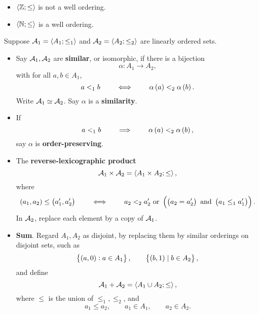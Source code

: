 \begin{example*}
\hfill
\begin{itemize}
\item $ \abr{\Z; \le} $ is not a well ordering.
\item $ \abr{\N; \le} $ is a well ordering.
\end{itemize}
\end{example*}


Suppose $ \AA_1 = \abr{A_1; \le_1} $ and $ \AA_2 = \abr{A_2; \le_2} $ are linearly ordered sets.

\begin{definition}
\hfill
\begin{itemize}
\item Say $ \AA_1, \AA_2 $ are \textbf{similar}, or isomorphic, if there is a bijection
$$ \alpha : A_1 \to A_2, $$
with for all $ a, b \in A_1 $,
$$ a <_1 b \qquad \iff \qquad \alpha\br{a} <_2 \alpha\br{b}. $$
Write $ \AA_1 \simeq \AA_2 $. Say $ \alpha $ is a \textbf{similarity}.
\item If
$$ a <_1 b \qquad \implies \qquad \alpha\br{a} <_2 \alpha\br{b}, $$
say $ \alpha $ is \textbf{order-preserving}.
\end{itemize}
\end{definition}

\begin{definition}
\hfill
\begin{itemize}
\item The \textbf{reverse-lexicographic product}
$$ \AA_1 \times \AA_2 = \abr{A_1 \times A_2; \le}, $$
where
$$ \br{a_1, a_2} \le \br{a_1', a_2'} \qquad \iff \qquad a_2 <_2 a_2' \ \text{or} \ \br{\br{a_2 = a_2'} \ \text{and} \ \br{a_1 \le_1 a_1'}}. $$
In $ \AA_2 $, replace each element by a copy of $ \AA_1 $.
\item \textbf{Sum}. Regard $ A_1, A_2 $ as disjoint, by replacing them by similar orderings on disjoint sets, such as
$$ \cbr{\br{a, 0} : a \in A_1}, \qquad \cbr{\br{b, 1} \mid b \in A_2}, $$
and define
$$ \AA_1 + \AA_2 = \abr{A_1 \cup A_2; \le}, $$
where $ \le $ is the union of $ \le_1, \le_2 $, and
$$ a_1 \le a_2, \qquad a_1 \in A_1, \qquad a_2 \in A_2. $$
\end{itemize}
\end{definition}

